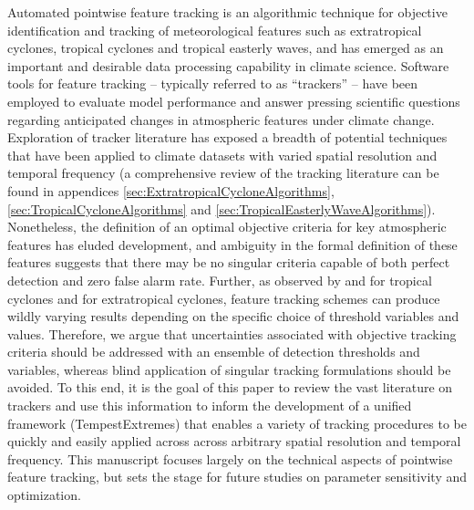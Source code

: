 \documentclass[gmdd, hvmath]{copernicus}
\begin{document}
\introduction  %

Automated pointwise feature tracking is an algorithmic technique for objective identification and tracking of meteorological features such as extratropical cyclones, tropical cyclones and tropical easterly waves, and has emerged as an important and desirable data processing capability in climate science.  Software tools for feature tracking -- typically referred to as ``trackers'' -- have been employed to evaluate model performance and answer pressing scientific questions regarding anticipated changes in atmospheric features under climate change.  Exploration of tracker literature has exposed a breadth of potential techniques that have been applied to climate datasets with varied spatial resolution and temporal frequency (a comprehensive review of the tracking literature can be found in appendices \ref{sec:ExtratropicalCycloneAlgorithms}, \ref{sec:TropicalCycloneAlgorithms} and \ref{sec:TropicalEasterlyWaveAlgorithms}).  Nonetheless, the definition of an optimal objective criteria for key atmospheric features has eluded development, and ambiguity in the formal definition of these features suggests that there may be no singular criteria capable of both perfect detection and zero false alarm rate.  Further, as observed by \cite{walsh2007objectively} and \citet{horn2014tracking} for tropical cyclones and \cite{neu2013imilast} for extratropical cyclones, feature tracking schemes can produce wildly varying results depending on the specific choice of threshold variables and values. Therefore, we argue that uncertainties associated with objective tracking criteria should be addressed with an ensemble of detection thresholds and variables, whereas blind application of singular tracking formulations should be avoided.  To this end, it is the goal of this paper to review the vast literature on trackers and use this information to inform the development of a unified framework (TempestExtremes) that enables a variety of tracking procedures to be quickly and easily applied across across arbitrary spatial resolution and temporal frequency.  This manuscript focuses largely on the technical aspects of pointwise feature tracking, but sets the stage for future studies on parameter sensitivity and optimization.
\end{document}
